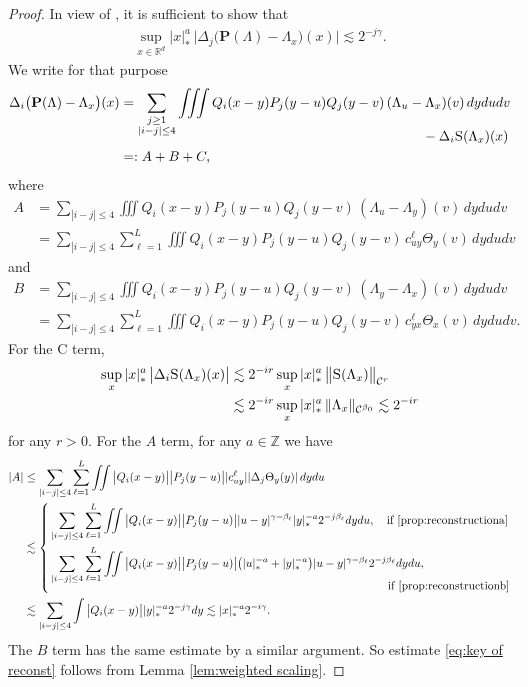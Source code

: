 \documentclass[JEP,XML,SOM,Unicode,published]{cedram}
\theoremstyle{plain}
\theoremstyle{definition}
\newcommand{\bfP}{\mathbf{P}}
\newcommand{\bbR}{\mathbb{R}}
\newcommand{\bbZ}{\mathbb{Z}}
\newcommand{\mcC}{\mathcal{C}}
\begin{document}
\begin{proof}
In view of \cite[Prop.\,9]{BH}, it is sufficient to show that
\begin{align}\label{eq:key of reconst}
\sup_{x\in\bbR^d}|x|_*^a\,\Big|\Delta_j\bigl(\bfP(\Lambda)-\Lambda_x\bigr)(x)\Big| \lesssim 2^{-j\gamma}.
\end{align}
We write for that purpose
\begin{align*}
\Delta_i\bigl(\bfP(\Lambda)-\Lambda_x\bigr)(x)&=\sum_{\substack{j\ge1\\ |i-j|\le4}}\iiint Q_i(x-y)P_j(y-u)Q_j(y-v)\,(\Lambda_u-\Lambda_x)(v)\,dydudv\\[-10pt]
& \hspace*{7.8cm}- \Delta_i\textsc{S}(\Lambda_x)(x)\\
&=:A+B+C,
\end{align*}
where
\begin{align*}
A
&=\sum_{|i-j|\le4}\iiint Q_i(x-y)P_j(y-u)Q_j(y-v)\,(\Lambda_u-\Lambda_y)(v)\,dydudv\\
&=\sum_{|i-j|\le4}\sum_{\ell=1}^L \iiint Q_i(x-y)P_j(y-u)Q_j(y-v)\,c_{uy}^\ell\Theta_y(v)\,dydudv
\end{align*}
and
\begin{align*}
B
&=\sum_{|i-j|\le4}\iiint Q_i(x-y)P_j(y-u)Q_j(y-v)\,(\Lambda_y-\Lambda_x)(v)\,dydudv\\
&=\sum_{|i-j|\le4}\sum_{\ell=1}^L \iiint Q_i(x-y)P_j(y-u)Q_j(y-v)\,c_{yx}^\ell\Theta_x(v)\,dydudv.
\end{align*}
For the C term,
\begin{align*}
\sup_x|x|_*^a\,\big|\Delta_i\textsc{S}(\Lambda_x)(x)\big| &\lesssim2^{-ir}\sup_x|x|_*^a\,\big\|\textsc{S}(\Lambda_x)\big\|_{\mcC^r} \\
&\lesssim 2^{-ir}\sup_x|x|_*^a\,\|\Lambda_x\|_{\mcC^{\beta_0}}\lesssim2^{-ir}
\end{align*}
for any $r>0$. For the $A$ term, for any $a\in\bbZ$ we have
\begin{align*}
|A|&
\le\sum_{|i-j|\le4}\sum_{\ell=1}^L \iint \big|Q_i(x-y)\big| \big|P_j(y-u)\big| |c_{uy}^\ell| |\Delta_j\Theta_y(y)|\,dydu\\
&\lesssim
\left\{
\begin{aligned}
&\sum_{|i-j|\le4}\sum_{\ell=1}^L \iint \big|Q_i(x-y)\big| \big|P_j(y-u)\big|
|u-y|^{\gamma-\beta_\ell}|y|_*^{-a}2^{-j\beta_\ell} dydu,\quad\text{if \eqref{prop:reconstructiona}}\\
&\sum_{|i-j|\le4}\sum_{\ell=1}^L \iint \big|Q_i(x-y)\big| \big|P_j(y-u)\big|
\bigl(|u|_*^{-a}+|y|_*^{-a}\bigr)|u-y|^{\gamma-\beta_\ell}2^{-j\beta_\ell} dydu,\\[-8pt]
&\hspace*{10.3cm}\text{if \eqref{prop:reconstructionb}}
\end{aligned}
\right.\\
&\lesssim\sum_{|i-j|\le4}
\int\big|Q_i(x-y)\big||y|_*^{-a}2^{-j\gamma}dy
\lesssim |x|_*^{-a}2^{-i\gamma}.
\end{align*}
The $B$ term has the same estimate by a similar argument. So estimate \eqref{eq:key of reconst} follows from Lemma \ref{lem:weighted scaling}.


\end{proof}
\end{document}
